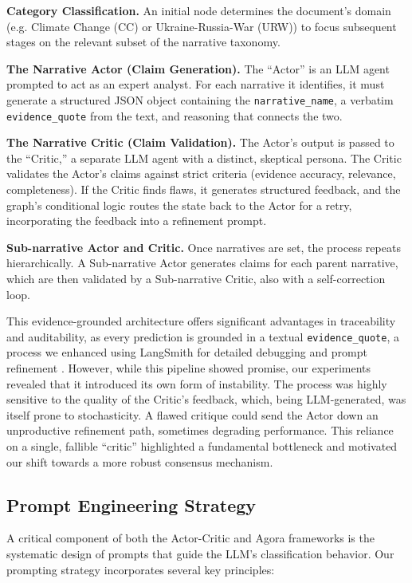 \textbf{Category Classification.} 
An initial node determines the document's domain (e.g. Climate Change (CC) or Ukraine-Russia-War (URW)) to focus subsequent stages on the relevant subset of the narrative taxonomy.

\textbf{The Narrative Actor (Claim Generation).}
The ``Actor'' is an LLM agent prompted to act as an expert analyst. For each narrative it identifies, it must generate a structured JSON object containing the \texttt{narrative\_name}, a verbatim \texttt{evidence\_quote} from the text, and reasoning that connects the two.

\textbf{The Narrative Critic (Claim Validation).}
The Actor's output is passed to the ``Critic,'' a separate LLM agent with a distinct, skeptical persona. The Critic validates the Actor's claims against strict criteria (evidence accuracy, relevance, completeness). If the Critic finds flaws, it generates structured feedback, and the graph's conditional logic routes the state back to the Actor for a retry, incorporating the feedback into a refinement prompt.

\textbf{Sub-narrative Actor and Critic.}
Once narratives are set, the process repeats hierarchically. A Sub-narrative Actor generates claims for each parent narrative, which are then validated by a Sub-narrative Critic, also with a self-correction loop.

This evidence-grounded architecture offers significant advantages in traceability and auditability, as every prediction is grounded in a textual \texttt{evidence\_quote}, a process we enhanced using LangSmith for detailed debugging and prompt refinement \citep{langsmith2024}. However, while this pipeline showed promise, our experiments revealed that it introduced its own form of instability. The process was highly sensitive to the quality of the Critic's feedback, which, being LLM-generated, was itself prone to stochasticity. A flawed critique could send the Actor down an unproductive refinement path, sometimes degrading performance. This reliance on a single, fallible ``critic'' highlighted a fundamental bottleneck and motivated our shift towards a more robust consensus mechanism.

\subsection{Prompt Engineering Strategy}

A critical component of both the Actor-Critic and Agora frameworks is the systematic design of prompts that guide the LLM's classification behavior. Our prompting strategy incorporates several key principles:

